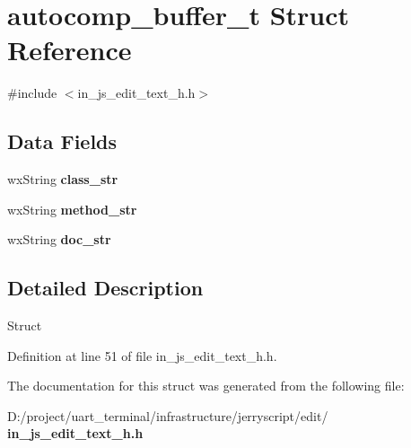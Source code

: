 \section{autocomp\+\_\+buffer\+\_\+t Struct Reference}
\label{structautocomp__buffer__t}


{\ttfamily \#include $<$in\+\_\+js\+\_\+edit\+\_\+text\+\_\+h.\+h$>$}

\subsection*{Data Fields}
\begin{DoxyCompactItemize}
\item 
\mbox{\label{structautocomp__buffer__t_a2d61950f3e619f4bf578507a74d357fb}} 
wx\+String {\bfseries class\+\_\+str}
\item 
\mbox{\label{structautocomp__buffer__t_a50fa1b1e2fb9973370fd358a20860bfd}} 
wx\+String {\bfseries method\+\_\+str}
\item 
\mbox{\label{structautocomp__buffer__t_a5022458fa3153c90582a7211ecb43f3a}} 
wx\+String {\bfseries doc\+\_\+str}
\end{DoxyCompactItemize}


\subsection{Detailed Description}
Struct 

Definition at line 51 of file in\+\_\+js\+\_\+edit\+\_\+text\+\_\+h.\+h.



The documentation for this struct was generated from the following file\+:\begin{DoxyCompactItemize}
\item 
D\+:/project/uart\+\_\+terminal/infrastructure/jerryscript/edit/\textbf{ in\+\_\+js\+\_\+edit\+\_\+text\+\_\+h.\+h}\end{DoxyCompactItemize}
